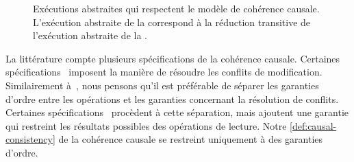 \begin{figure}[tbh]
\begin{subfigure}{\linewidth}
    \caption{}\label{fig:vis-vs-pre-2}
\end{subfigure}
\caption[Exécutions abstraites qui respectent le modèle de cohérence causale]{Exécutions abstraites qui respectent le modèle de cohérence causale.
L'exécution abstraite de la  correspond à la réduction transitive de l'exécution abstraite de la .}\label{fig:vis-vs-pre}
\end{figure}

La littérature compte plusieurs spécifications de la cohérence causale.
Certaines spécifications~\autocite{ahamad_1995_causal} imposent la manière de résoudre les conflits de modification.
Similairement à~\textcite{mahajan_2011_cac}, nous pensons qu'il est préférable de séparer les garanties d'ordre entre les opérations et les garanties concernant la résolution de conflits.
Certaines spécifications~\autocite{burckhardt_eventualconsistency_2014,viotti_consistency_2016} procèdent à cette séparation, mais ajoutent une garantie qui restreint les résultats possibles des opérations de lecture.
Notre \autoref{def:causal-consistency} de la cohérence causale se restreint uniquement à des garanties d'ordre.

